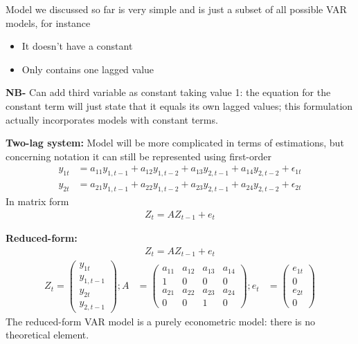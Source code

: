\documentclass{beamer}
\begin{document}
\begin{frame}
  Model we discussed so far is very simple and is just a subset of all possible VAR models, for instance
  \begin{itemize}
  \item It doesn't have a constant
  \item Only contains one lagged value
  \end{itemize}
  \medskip
  \textbf{NB-} Can add third variable as constant taking value 1: the equation for the constant term will just state that it equals its own lagged values; this formulation actually incorporates models with constant terms.
\end{frame}

\begin{frame}
  \textbf{Two-lag system:} Model will be more complicated in terms of estimations, but concerning notation it can still be represented using first-order 
  \begin{align}
    y_{1t} &= a_{11} y_{1, t-1} + a_{12} y_{1,t-2} + a_{13} y_{2, t-1} + a_{14} y_{2,t-2} + \epsilon_{1t}\\
    y_{2t} &= a_{21} y_{1, t-1} + a_{22} y_{1,t-2} + a_{23} y_{2, t-1} + a_{24} y_{2,t-2} + \epsilon_{2t}
  \end{align}
  \medskip
  In matrix form
  \begin{align}  
    Z_t = AZ_{t-1} + e_t 
  \end{align}
\end{frame}

\begin{frame}
  \textbf{Reduced-form:}
  \begin{align*}
    Z_t = AZ_{t-1} + e_t 
  \end{align*}
  \begin{align}
      Z_t= \begin{pmatrix}
      y_{1t} \\ y_{1,t-1} \\ y_{2t} \\ y_{2,t-1}    
      \end{pmatrix};
      A & = \begin{pmatrix}
        a_{11} & a_{12} & a_{13} & a_{14}\\
        1      & 0      & 0      & 0\\
        a_{21} & a_{22} & a_{23} & a_{24}\\
        0      & 0      & 1      & 0    
      \end{pmatrix};
      e_t &= \begin{pmatrix}
        e_{1t} \\ 0 \\ e_{2t} \\ 0 
      \end{pmatrix}
    \end{align}
    \medskip
    The reduced-form VAR model is a purely econometric model: there is no theoretical element.      
\end{frame}
\end{document}
